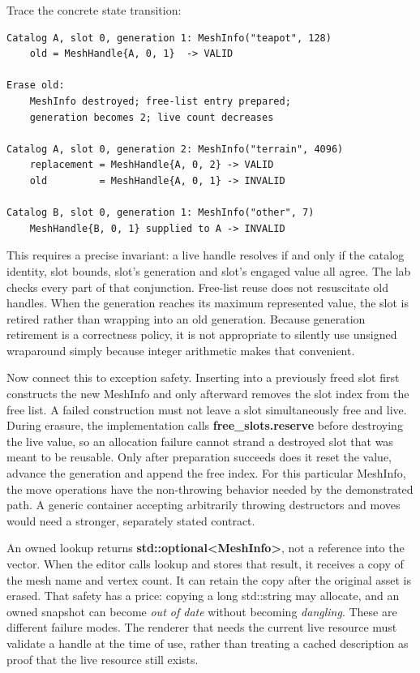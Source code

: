 Trace the concrete state transition:

\begin{verbatim}
Catalog A, slot 0, generation 1: MeshInfo("teapot", 128)
    old = MeshHandle{A, 0, 1}  -> VALID

Erase old:
    MeshInfo destroyed; free-list entry prepared;
    generation becomes 2; live count decreases

Catalog A, slot 0, generation 2: MeshInfo("terrain", 4096)
    replacement = MeshHandle{A, 0, 2} -> VALID
    old         = MeshHandle{A, 0, 1} -> INVALID

Catalog B, slot 0, generation 1: MeshInfo("other", 7)
    MeshHandle{B, 0, 1} supplied to A -> INVALID
\end{verbatim}

This requires a precise invariant: a live handle resolves if and only if the catalog identity, slot bounds, slot's generation and slot's engaged value all agree. The lab checks every part of that conjunction. Free-list reuse does not resuscitate old handles. When the generation reaches its maximum represented value, the slot is retired rather than wrapping into an old generation. Because generation retirement is a correctness policy, it is not appropriate to silently use unsigned wraparound simply because integer arithmetic makes that convenient.

Now connect this to exception safety. Inserting into a previously freed slot first constructs the new MeshInfo and only afterward removes the slot index from the free list. A failed construction must not leave a slot simultaneously free and live. During erasure, the implementation calls \textbf{free\_slots.reserve} before destroying the live value, so an allocation failure cannot strand a destroyed slot that was meant to be reusable. Only after preparation succeeds does it reset the value, advance the generation and append the free index. For this particular MeshInfo, the move operations have the non-throwing behavior needed by the demonstrated path. A generic container accepting arbitrarily throwing destructors and moves would need a stronger, separately stated contract.

An owned lookup returns \textbf{std::optional\textless MeshInfo\textgreater{}}, not a reference into the vector. When the editor calls lookup and stores that result, it receives a copy of the mesh name and vertex count. It can retain the copy after the original asset is erased. That safety has a price: copying a long std::string may allocate, and an owned snapshot can become \emph{out of date} without becoming \emph{dangling}. These are different failure modes. The renderer that needs the current live resource must validate a handle at the time of use, rather than treating a cached description as proof that the live resource still exists.

